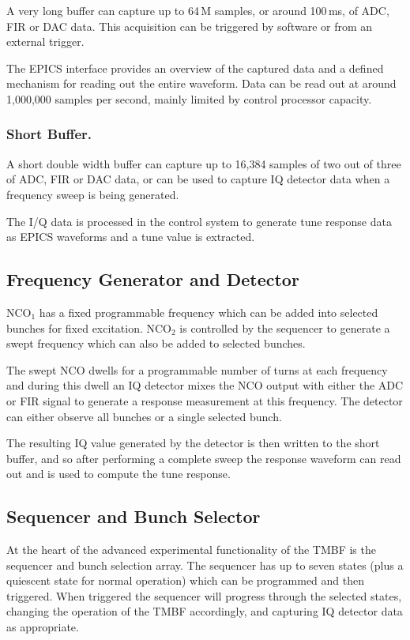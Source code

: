 \documentclass{JAC2003}
\newcommand{\textsubscript}[1]{$_{\text{#1}}$}
\newcommand{\NCO}[1]{NCO\textsubscript{#1}}
\begin{document}
A very long buffer can capture up to 64\,M samples, or around 100\,ms, of ADC,
FIR or DAC data.  This acquisition can be triggered by software or from an
external trigger.

The EPICS interface provides an overview of the captured data and a defined
mechanism for reading out the entire waveform.  Data can be read out at around
1,000,000 samples per second, mainly limited by control processor capacity.

\subsubsection{Short Buffer.}

A short double width buffer can capture up to 16,384 samples of two out of three
of ADC, FIR or DAC data, or can be used to capture IQ detector data when a
frequency sweep is being generated.

The I/Q data is processed in the control system to generate tune response data
as EPICS waveforms and a tune value is extracted.


\subsection{Frequency Generator and Detector}

\NCO1 has a fixed programmable frequency which can be added into selected
bunches for fixed excitation.  \NCO2 is controlled by the sequencer to generate
a swept frequency which can also be added to selected bunches.

The swept NCO dwells for a programmable number of turns at each frequency and
during this dwell an IQ detector mixes the NCO output with either the ADC or FIR
signal to generate a response measurement at this frequency.  The detector can
either observe all bunches or a single selected bunch.

The resulting IQ value generated by the detector is then written to the short
buffer, and so after performing a complete sweep the response waveform can read
out and is used to compute the tune response.


\subsection{Sequencer and Bunch Selector}

At the heart of the advanced experimental functionality of the TMBF is the
sequencer and bunch selection array.  The sequencer has up to seven states (plus
a quiescent state for normal operation) which can be programmed and then
triggered.  When triggered the sequencer will progress through the selected
states, changing the operation of the TMBF accordingly, and capturing IQ
detector data as appropriate.
\end{document}
